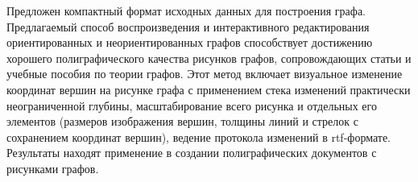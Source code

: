 
Предложен компактный формат исходных данных для построения графа. Предлагаемый способ
воспроизведения и интерактивного редактирования ориентированных и неориентированных графов способствует достижению
хорошего полиграфического качества рисунков графов, сопровождающих статьи и учебные пособия по теории графов.
Этот метод включает визуальное изменение координат вершин на рисунке графа с применением стека изменений
практически неограниченной глубины, масштабирование всего рисунка и отдельных его элементов (размеров изображения
вершин, толщины линий и стрелок с сохранением координат вершин), ведение протокола изменений в rtf-формате.
Результаты находят применение в создании полиграфических документов с рисунками графов.











